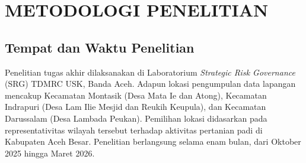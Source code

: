 
\chapter{METODOLOGI PENELITIAN}

\section{Tempat dan Waktu Penelitian}
Penelitian tugas akhir dilaksanakan di Laboratorium \textit{Strategic Risk Governance} (SRG) TDMRC USK, Banda Aceh. Adapun lokasi pengumpulan data lapangan mencakup Kecamatan Montasik (Desa Mata Ie dan Atong), Kecamatan Indrapuri (Desa Lam Ilie Mesjid dan Reukih Keupula), dan Kecamatan Darussalam (Desa Lambada Peukan). Pemilihan lokasi didasarkan pada representativitas wilayah tersebut terhadap aktivitas pertanian padi di Kabupaten Aceh Besar. Penelitian berlangsung selama enam bulan, dari Oktober 2025 hingga Maret 2026.


